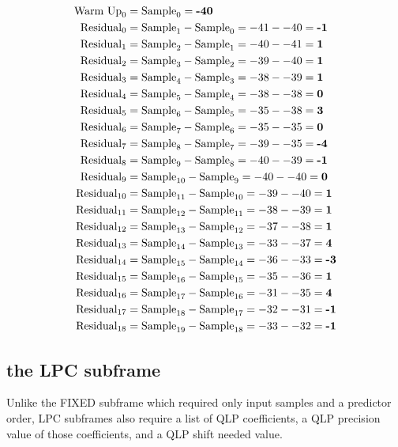 \begin{align*}
\text{Warm Up}_0 &= \text{Sample}_0 = \textbf{-40} \\
\text{Residual}_0 &= \text{Sample}_1 - \text{Sample}_0 = -41 - -40 = \textbf{-1} \\
\text{Residual}_1 &= \text{Sample}_2 - \text{Sample}_1 = -40 - -41 = \textbf{1} \\
\text{Residual}_2 &= \text{Sample}_3 - \text{Sample}_2 = -39 - -40 = \textbf{1} \\
\text{Residual}_3 &= \text{Sample}_4 - \text{Sample}_3 = -38 - -39 = \textbf{1} \\
\text{Residual}_4 &= \text{Sample}_5 - \text{Sample}_4 = -38 - -38 = \textbf{0} \\
\text{Residual}_5 &= \text{Sample}_6 - \text{Sample}_5 = -35 - -38 = \textbf{3} \\
\text{Residual}_6 &= \text{Sample}_7 - \text{Sample}_6 = -35 - -35 = \textbf{0} \\
\text{Residual}_7 &= \text{Sample}_8 - \text{Sample}_7 = -39 - -35 = \textbf{-4} \\
\text{Residual}_8 &= \text{Sample}_9 - \text{Sample}_8 = -40 - -39 = \textbf{-1} \\
\text{Residual}_9 &= \text{Sample}_{10} - \text{Sample}_9 = -40 - -40 = \textbf{0} \\
\text{Residual}_{10} &= \text{Sample}_{11} - \text{Sample}_{10} = -39 - -40 = \textbf{1} \\
\text{Residual}_{11} &= \text{Sample}_{12} - \text{Sample}_{11} = -38 - -39 = \textbf{1} \\
\text{Residual}_{12} &= \text{Sample}_{13} - \text{Sample}_{12} = -37 - -38 = \textbf{1} \\
\text{Residual}_{13} &= \text{Sample}_{14} - \text{Sample}_{13} = -33 - -37 = \textbf{4} \\
\text{Residual}_{14} &= \text{Sample}_{15} - \text{Sample}_{14} = -36 - -33 = \textbf{-3} \\
\text{Residual}_{15} &= \text{Sample}_{16} - \text{Sample}_{15} = -35 - -36 = \textbf{1} \\
\text{Residual}_{16} &= \text{Sample}_{17} - \text{Sample}_{16} = -31 - -35 = \textbf{4} \\
\text{Residual}_{17} &= \text{Sample}_{18} - \text{Sample}_{17} = -32 - -31 = \textbf{-1} \\
\text{Residual}_{18} &= \text{Sample}_{19} - \text{Sample}_{18} = -33 - -32 = \textbf{-1} \\
\end{align*}

\clearpage

\subsection{the LPC subframe}
\label{flac_lpc_encoding}
Unlike the FIXED subframe which required only input samples and a
predictor order, LPC subframes also require a list of QLP coefficients,
a QLP precision value of those coefficients, and a QLP shift needed
value.

